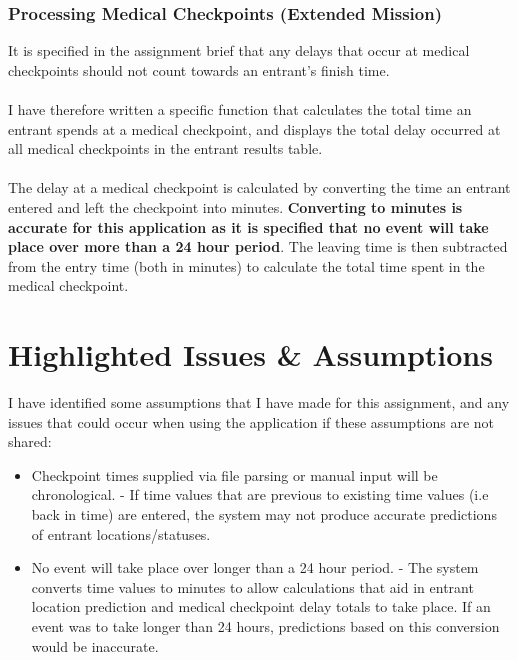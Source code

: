 \documentclass[12pt]{article}
\begin{document}
\subsubsection{Processing Medical Checkpoints (Extended Mission)}

It is specified in the assignment brief that any delays that occur at medical checkpoints should not count towards an entrant's finish time.\\\\
I have therefore written a specific function that calculates the total time an entrant spends at a medical checkpoint, and displays the total delay occurred at all medical checkpoints in the entrant results table. \\\\
The delay at a medical checkpoint is calculated by converting the time an entrant entered and left the checkpoint into minutes. \textbf{Converting to minutes is accurate for this application as it is specified that no event will take place over more than a 24 hour period}. The leaving time is then subtracted from the entry time (both in minutes) to calculate the total time spent in the medical checkpoint. 

\section{Highlighted Issues \& Assumptions}
I have identified some assumptions that I have made for this assignment, and any issues that could occur when using the application if these assumptions are not shared:

\begin{itemize}

\item Checkpoint times supplied via file parsing or manual input will be chronological. - If time values that are previous to existing time values (i.e back in time) are entered, the system may not produce accurate predictions of entrant locations/statuses.

\item No event will take place over longer than a 24 hour period. - The system converts time values to minutes to allow calculations that aid in entrant location prediction and medical checkpoint delay totals to take place. If an event was to take longer than 24 hours, predictions based on this conversion would be inaccurate.

\end{itemize}

\clearpage 
\end{document}
